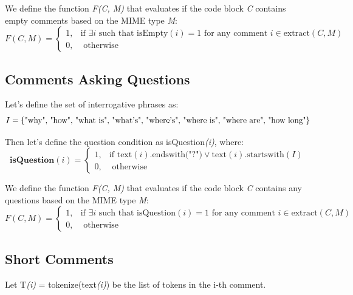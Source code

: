 \noindent We define the function \textit{F(C, M)} that evaluates if the code block \textit{C} contains empty comments based on the MIME type \textit{M}:
\begin{equation*}
	F(C, M) = \begin{cases}
		1, & \text{if } \exists i \text{ such that } \text{isEmpty}(i) = 1 \text{ for any comment } i \in \text{extract}(C, M) \\
		0, & \text{ otherwise}
	\end{cases}
\end{equation*}

\subsection{Comments Asking Questions}
Let's define the set of interrogative phrases as:
\begin{equation*}
	I = \text{\{"why", "how", "what is", "what\\'s", "where\\'s", "where is", "where are", "how long"\}}
\end{equation*}

\noindent Then let's define the question condition as isQuestion\textit{(i)}, where:
\begin{equation*}
	\textbf{isQuestion}(i) = \begin{cases}
		1, & \text{if } \text{text}(i) \text{.endswith("?")} \vee \text{text}(i) \text{.startswith}(I) \\
		0, & \text{ otherwise}
	\end{cases}
\end{equation*}

\noindent We define the function \textit{F(C, M)} that evaluates if the code block \textit{C} contains any questions based on the MIME type \textit{M}:
\begin{equation*}
	F(C, M) = \begin{cases}
		1, & \text{if } \exists i \text{ such that } \text{isQuestion}(i) = 1 \text{ for any comment } i \in \text{extract}(C, M) \\
		0, & \text{ otherwise}
	\end{cases}
\end{equation*}

\subsection{Short Comments}
Let T\textit{(i)} = tokenize(text\textit{(i)}) be the list of tokens in the i-th comment.


